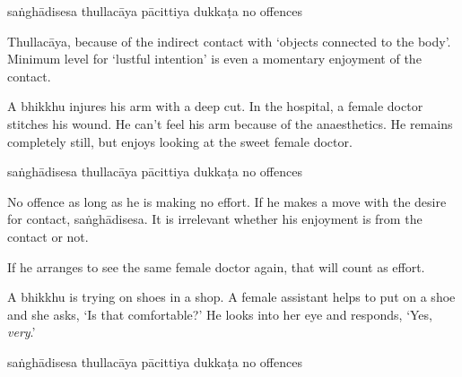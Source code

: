\begin{exam}{\autoExamName}
\begin{problem*}
\begin{parts}
    \bigskip

    \begin{answers}{5}
      \bChoices
       saṅghādisesa\eAns
       thullacāya\eAns
       pācittiya\eAns
       dukkaṭa\eAns
       no offences\eAns
      \eChoices
    \end{answers}

    \begin{solution}
      Thullacāya, because of the indirect contact with `objects connected to the body'.
      Minimum level for `lustful intention' is even a momentary enjoyment of the contact.
    \end{solution}

    \bigskip

  \item A bhikkhu injures his arm with a deep cut. In the hospital, a female
    doctor stitches his wound. He can't feel his arm because of the
    anaesthetics. He remains completely still, but enjoys looking at the sweet female doctor.

    \bigskip

    \begin{answers}{5}
      \bChoices
       saṅghādisesa\eAns
       thullacāya\eAns
       pācittiya\eAns
       dukkaṭa\eAns
       no offences\eAns
      \eChoices
    \end{answers}

    \begin{solution}
      No offence as long as he is making no effort.
      If he makes a move with the desire for contact, saṅghādisesa.
      It is irrelevant whether his enjoyment is from the contact or not.

      If he arranges to see the same female doctor again, that will count as effort.
    \end{solution}

    \bigskip

  \item A bhikkhu is trying on shoes in a shop. A female assistant helps to put
    on a shoe and she asks, `Is that comfortable?' He looks into her eye and
    responds, `Yes, \textit{very}.'

    \bigskip

    \begin{answers}{5}
      \bChoices
       saṅghādisesa\eAns
       thullacāya\eAns
       pācittiya\eAns
       dukkaṭa\eAns
       no offences\eAns
      \eChoices
    \end{answers}


\end{parts}
\end{problem*}
\end{exam}
